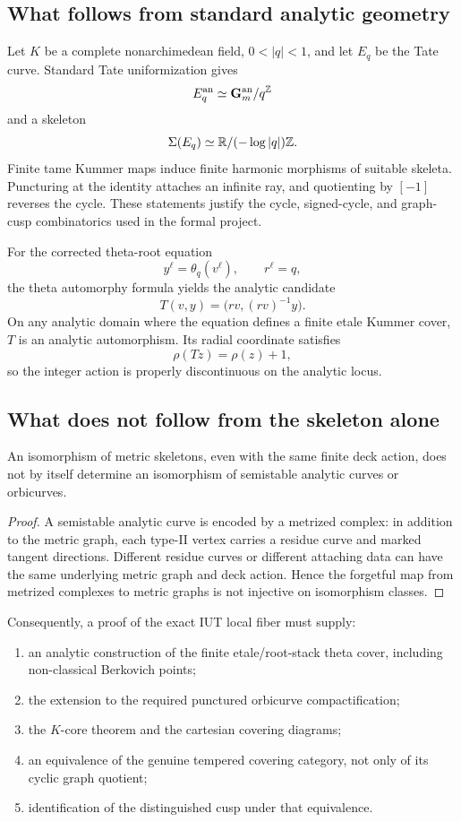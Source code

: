 
\subsection{What follows from standard analytic geometry}

Let $K$ be a complete nonarchimedean field, $0<|q|<1$, and let $E_q$ be the Tate curve.  Standard Tate uniformization gives
\[
 E_q^{\mathrm{an}}\simeq\mathbf G_m^{\mathrm{an}}/q^{\mathbb Z}
\]
and a skeleton
\[
 \Sigma(E_q)\simeq\mathbb R/(-\log|q|)\mathbb Z.
\]
Finite tame Kummer maps induce finite harmonic morphisms of suitable skeleta.  Puncturing at the identity attaches an infinite ray, and quotienting by $[-1]$ reverses the cycle.  These statements justify the cycle, signed-cycle, and graph-cusp combinatorics used in the formal project.

For the corrected theta-root equation
\[
 y^\ell=\theta_q(v^\ell),\qquad r^\ell=q,
\]
the theta automorphy formula yields the analytic candidate
\[
 T(v,y)=\bigl(rv,(rv)^{-1}y\bigr).
\]
On any analytic domain where the equation defines a finite etale Kummer cover, $T$ is an analytic automorphism.  Its radial coordinate satisfies
\[
 \rho(Tz)=\rho(z)+1,
\]
so the integer action is properly discontinuous on the analytic locus.

\subsection{What does not follow from the skeleton alone}

\begin{proposition}\label{prop:skeleton-insufficient}
An isomorphism of metric skeletons, even with the same finite deck action, does not by itself determine an isomorphism of semistable analytic curves or orbicurves.
\end{proposition}

\begin{proof}
A semistable analytic curve is encoded by a metrized complex: in addition to the metric graph, each type-II vertex carries a residue curve and marked tangent directions.  Different residue curves or different attaching data can have the same underlying metric graph and deck action.  Hence the forgetful map from metrized complexes to metric graphs is not injective on isomorphism classes.
\end{proof}

Consequently, a proof of the exact IUT local fiber must supply:
\begin{enumerate}[label=(\roman*)]
\item an analytic construction of the finite etale/root-stack theta cover, including non-classical Berkovich points;
\item the extension to the required punctured orbicurve compactification;
\item the $K$-core theorem and the cartesian covering diagrams;
\item an equivalence of the genuine tempered covering category, not only of its cyclic graph quotient;
\item identification of the distinguished cusp under that equivalence.
\end{enumerate}

